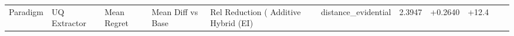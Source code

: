 \begin{tabular}{lllllllllll}
\toprule
Paradigm & UQ Extractor & Mean Regret & Mean Diff vs Base & Rel Reduction (%
\midrule
Additive Hybrid (EI) & distance_evidential & 2.3947 & +0.2640 & +12.4%
\bottomrule
\end{tabular}
